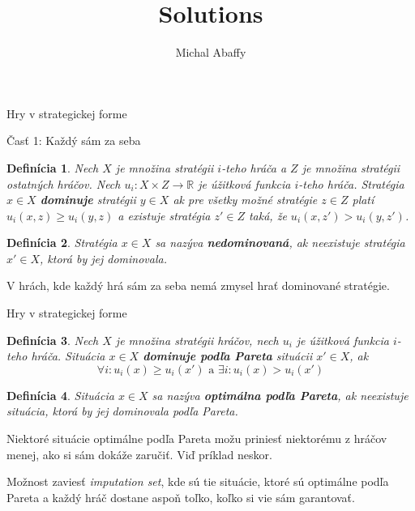 \documentclass{beamer}
\newtheorem*{mydef}{Defin\'icia}
\begin{document}
\title{Solutions}
\author{Michal Abaffy}
\frame{\titlepage}




\begin{frame}{Hry v strategickej forme}

\v{C}as\v{t} 1: Ka\v{z}d\'y s\'am za seba

\begin{mydef}
Nech $X$ je mno\v{z}ina strat\'egii $i$-teho hr\'a\v{c}a a $Z$ je mno\v{z}ina strat\'egii ostatn\'ych hr\'a\v{c}ov. Nech $u_{i}: X \times Z \to \mathbb{R}$ je \'u\v{z}itkov\'a funkcia $i$-teho hr\'a\v{c}a. Strat\'egia $x \in X$ {\bf dominuje} strat\'egii $y \in X$ ak pre v\v{s}etky mo\v{z}n\'e strat\'egie $z \in Z$ plat\'i $u_{i}(x,z) \geq u_{i}(y,z)$ a existuje strat\'egia $z' \in Z$ tak\'a, \v{z}e $u_{i}(x,z') > u_{i}(y,z')$.

\end{mydef}

\begin{mydef}
Strat\'egia $x\in X$ sa naz\'yva {\bf nedominovan\'a}, ak neexistuje strat\'egia $x' \in X$, ktor\'a by jej dominovala.
\end{mydef}

V hr\'ach, kde ka\v{z}d\'y hr\'a s\'am za seba nem\'a zmysel hra\v{t} dominovan\'e strat\'egie.

\end{frame}


\begin{frame}{Hry v strategickej forme}

\begin{mydef}
Nech $X$ je mno\v{z}ina strat\'egii hr\'a\v{c}ov, nech $u_{i}$ je \'u\v{z}itkov\'a funkcia $i$-teho hr\'a\v{c}a. Situ\'acia $x \in X$ {\bf dominuje pod\v{l}a Pareta} situ\'acii $x' \in X$, ak \[\forall i: u_{i}(x) \geq u_{i}(x') \textrm{ a } \exists i: u_{i}(x) > u_{i}(x')\]

\end{mydef}

\begin{mydef}
Situ\'acia $x\in X$ sa naz\'yva {\bf optim\'alna pod\v{l}a Pareta}, ak neexistuje situ\'acia, ktor\'a by jej dominovala pod\v{l}a Pareta. 
\end{mydef}

Niektor\'e situ\'acie optim\'alne pod\v{l}a Pareta mo\v{z}u prinies\v{t} niektor\'emu z hr\'a\v{c}ov menej, ako si s\'am dok\'a\v{z}e zaru\v{c}i\v{t}. Vi\v{d} pr\'iklad neskor. 

Mo\v{z}nost zavies\v{t} \emph{imputation set}, kde s\'u tie situ\'acie, ktor\'e s\'u optim\'alne pod\v{l}a Pareta a ka\v{z}d\'y hr\'a\v{c} dostane aspo\v{n} to\v{l}ko, ko\v{l}ko si vie s\'am garantova\v{t}.
\end{frame}
\end{document}
